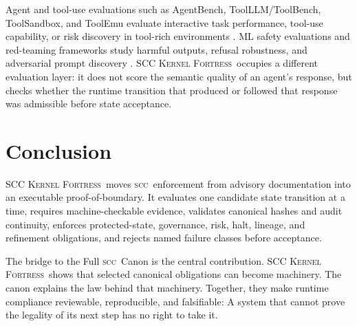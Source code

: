 \documentclass{article}
\newcommand{\SCC}{\textsc{scc}}
\newcommand{\KF}{\textsc{SCC Kernel Fortress}}
\begin{document}
Agent and tool-use evaluations such as AgentBench, ToolLLM/ToolBench, ToolSandbox, and ToolEmu evaluate interactive task performance, tool-use capability, or risk discovery in tool-rich environments \citep{liu2024agentbench,qin2024toolllm,lu2025toolsandbox,ruan2023toolemu}. ML safety evaluations and red-teaming frameworks study harmful outputs, refusal robustness, and adversarial prompt discovery \citep{ganguli2022redteaming,mazeika2024harmbench}. \KF\ occupies a different evaluation layer: it does not score the semantic quality of an agent's response, but checks whether the runtime transition that produced or followed that response was admissible before state acceptance.

\section{Conclusion}
\KF\ moves \SCC\ enforcement from advisory documentation into an executable proof-of-boundary. It evaluates one candidate state transition at a time, requires machine-checkable evidence, validates canonical hashes and audit continuity, enforces protected-state, governance, risk, halt, lineage, and refinement obligations, and rejects named failure classes before acceptance.

The bridge to the Full \SCC\ Canon is the central contribution. \KF\ shows that selected canonical obligations can become machinery. The canon explains the law behind that machinery. Together, they make runtime compliance reviewable, reproducible, and falsifiable: A system that cannot prove the legality of its next step has no right to take it.
\end{document}
